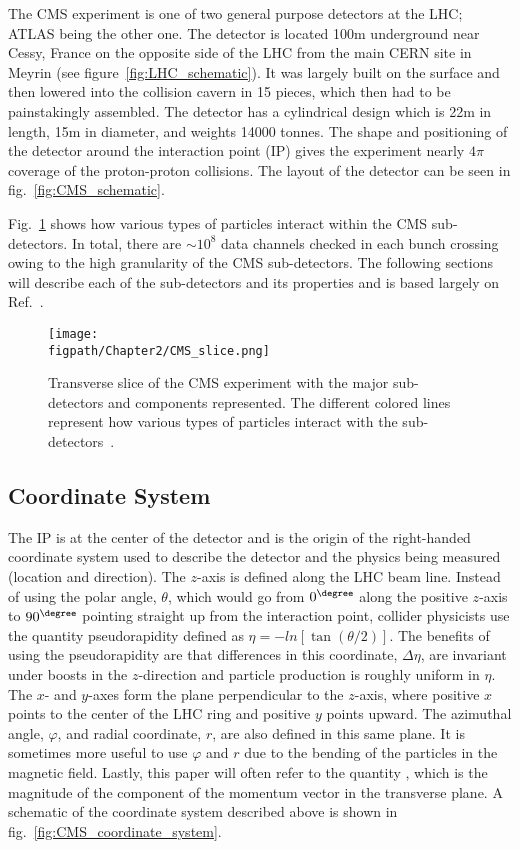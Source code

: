 The CMS experiment is one of two general purpose detectors at the LHC; ATLAS being the other one.
The detector is located 100\unit{m} underground near Cessy, France on the opposite side of the LHC from the main CERN site in Meyrin (see figure~\ref{fig:LHC_schematic}).
It was largely built on the surface and then lowered into the collision cavern in 15 pieces, which then had to be painstakingly assembled.
The detector has a cylindrical design which is 22\unit{m} in length, 15\unit{m} in diameter, and weights 14000 tonnes.
The shape and positioning of the detector around the interaction point (IP) gives the experiment nearly $4\pi$ coverage of the proton-proton collisions.
The layout of the detector can be seen in fig.~\ref{fig:CMS_schematic}.

Fig.~\ref{fig:CMS_transverse} shows how various types of particles interact within the CMS sub-detectors.
In total, there are ${\sim}10^8$ data channels checked in each bunch crossing owing to the high granularity of the CMS sub-detectors.
The following sections will describe each of the sub-detectors and its properties and is based largely on Ref.~\cite{Chatrchyan:2008aa}.

\begin{figure}[!hbt]
    \centering
    \texttt{[image: \\figpath/Chapter2/CMS\_slice.png]}
    \caption{Transverse slice of the CMS experiment with the major sub-detectors and components represented. The different colored lines represent how various types of particles interact with the sub-detectors~\cite{CMSSlice}.}
    \label{fig:CMS_transverse}
\end{figure}

\subsection{Coordinate System}

The IP is at the center of the detector and is the origin of the right-handed coordinate system used to describe the detector and the physics being measured (location and direction).
The $z$-axis is defined along the LHC beam line.
Instead of using the polar angle, $\theta$, which would go from $0^{\degree}$ along the positive $z$-axis to $90^{\degree}$ pointing straight up from the interaction point, collider physicists use the quantity pseudorapidity defined as $\eta=-ln\left[\tan\left(\theta/2\right)\right]$.
The benefits of using the pseudorapidity are that differences in this coordinate, $\Delta\eta$, are invariant under boosts in the $z$-direction and particle production is roughly uniform in $\eta$.
The $x$- and $y$-axes form the plane perpendicular to the $z$-axis, where positive $x$ points to the center of the LHC ring and positive $y$ points upward.
The azimuthal angle, $\varphi$, and radial coordinate, $r$, are also defined in this same plane.
It is sometimes more useful to use $\varphi$ and $r$ due to the bending of the particles in the magnetic field.
Lastly, this paper will often refer to the quantity \pt, which is the magnitude of the component of the momentum vector in the transverse plane.
A schematic of the coordinate system described above is shown in fig.~\ref{fig:CMS_coordinate_system}.

